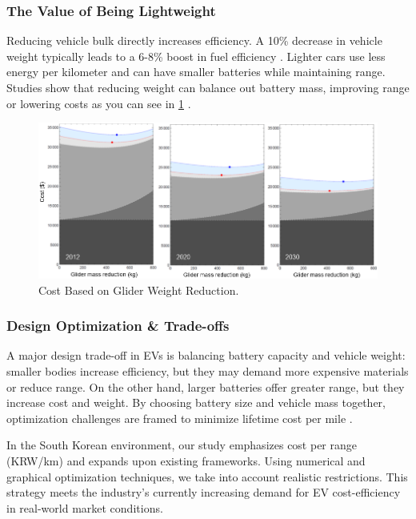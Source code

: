 \documentclass[11pt,twocolumn]{article}
\begin{document}
            \subsubsection{The Value of Being Lightweight}
                Reducing vehicle bulk directly increases efficiency.
                A 10\% decrease in vehicle weight typically leads to a 6-8\% boost in fuel efficiency \cite{doe23b}.
                Lighter cars use less energy per kilometer and can have smaller batteries while maintaining range.
                Studies show that reducing weight can balance out battery mass, improving range or lowering costs as you can see in \cref{gliderReduction} \cite{doe23b}\cite{nrel23}.
                \begin{figure}[h]
                    \centering
                    \includegraphics[width=.8\columnwidth]{gliderReduction.png}
                    \caption{Cost Based on Glider Weight Reduction.}
                    \label{gliderReduction}
                \end{figure}
            \subsubsection{Design Optimization \& Trade-offs}
                A major design trade-off in EVs is balancing battery capacity and vehicle weight: smaller bodies increase efficiency, but they may demand more expensive materials or reduce range.
                On the other hand, larger batteries offer greater range, but they increase cost and weight.
                By choosing battery size and vehicle mass together, optimization challenges are framed to minimize lifetime cost per mile \cite{nrel23}.
                \par
                In the South Korean environment, our study emphasizes cost per range (KRW/km) and expands upon existing frameworks.
                Using numerical and graphical optimization techniques, we take into account realistic restrictions.
                This strategy meets the industry's currently increasing demand for EV cost-efficiency in real-world market conditions.
\end{document}
